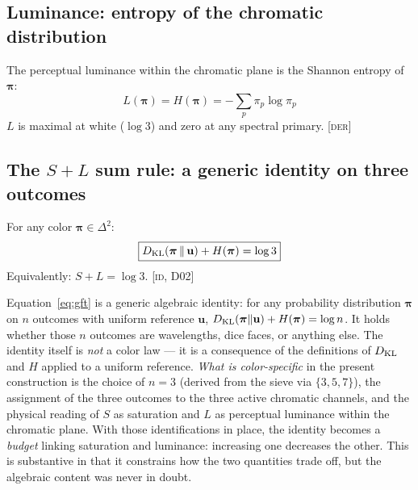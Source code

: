 \documentclass[12pt,a4paper]{article}
\begin{document}
\subsection{Luminance: entropy of the chromatic distribution}

\begin{derivedbox}
The perceptual luminance within the chromatic plane is the Shannon
entropy of $\bm{\pi}$:
\begin{equation}
  L(\bm{\pi}) = H(\bm{\pi}) = -\sum_{p} \pi_p \log \pi_p
  \label{eq:luminance}
\end{equation}
$L$ is maximal at white ($\log 3$) and zero at any spectral primary.
\textsc{[der]}
\end{derivedbox}

\subsection{The $S + L$ sum rule: a generic identity on three outcomes}

\begin{identitybox}
For any color $\bm{\pi} \in \Delta^2$:
\begin{equation}
  \boxed{D_{\mathrm{KL}}(\bm{\pi} \,\|\, \mathbf{u}) + H(\bm{\pi}) = \log 3}
  \label{eq:gft}
\end{equation}
Equivalently: $S + L = \log 3$. \textsc{[id, D02]}
\end{identitybox}

\begin{remark}
Equation~\eqref{eq:gft} is a generic algebraic identity: for any
probability distribution $\bm{\pi}$ on $n$ outcomes with uniform
reference $\mathbf{u}$,
$D_{\mathrm{KL}}(\bm{\pi}\|\mathbf{u}) + H(\bm{\pi}) = \log n$. It holds whether
those $n$ outcomes are wavelengths, dice faces, or anything else. The
identity itself is \emph{not} a color law --- it is a consequence of
the definitions of $D_{\mathrm{KL}}$ and $H$ applied to a uniform reference.
\emph{What is color-specific} in the present construction is the
choice of $n = 3$ (derived from the sieve via $\{3,5,7\}$), the
assignment of the three outcomes to the three active chromatic
channels, and the physical reading of $S$ as saturation and $L$ as
perceptual luminance within the chromatic plane. With those
identifications in place, the identity becomes a \emph{budget} linking
saturation and luminance: increasing one decreases the other. This is
substantive in that it constrains how the two quantities trade off,
but the algebraic content was never in doubt.
\end{remark}
\end{document}

